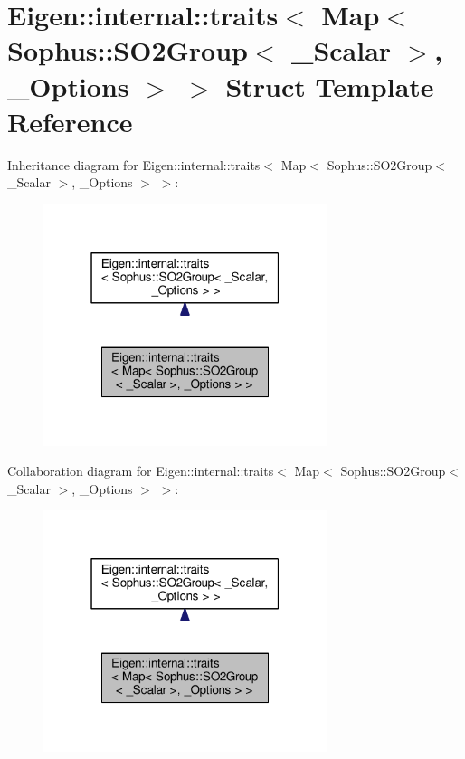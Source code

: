 \hypertarget{struct_eigen_1_1internal_1_1traits_3_01_map_3_01_sophus_1_1_s_o2_group_3_01___scalar_01_4_00_01___options_01_4_01_4}{}\section{Eigen\+:\+:internal\+:\+:traits$<$ Map$<$ Sophus\+:\+:S\+O2\+Group$<$ \+\_\+\+Scalar $>$, \+\_\+\+Options $>$ $>$ Struct Template Reference}
\label{struct_eigen_1_1internal_1_1traits_3_01_map_3_01_sophus_1_1_s_o2_group_3_01___scalar_01_4_00_01___options_01_4_01_4}


Inheritance diagram for Eigen\+:\+:internal\+:\+:traits$<$ Map$<$ Sophus\+:\+:S\+O2\+Group$<$ \+\_\+\+Scalar $>$, \+\_\+\+Options $>$ $>$\+:
\nopagebreak
\begin{figure}[H]
\begin{center}
\leavevmode
\includegraphics[width=235pt]{struct_eigen_1_1internal_1_1traits_3_01_map_3_01_sophus_1_1_s_o2_group_3_01___scalar_01_4_00_01_bf56f312ddf275fb7036c655b98f5183}
\end{center}
\end{figure}


Collaboration diagram for Eigen\+:\+:internal\+:\+:traits$<$ Map$<$ Sophus\+:\+:S\+O2\+Group$<$ \+\_\+\+Scalar $>$, \+\_\+\+Options $>$ $>$\+:
\nopagebreak
\begin{figure}[H]
\begin{center}
\leavevmode
\includegraphics[width=235pt]{struct_eigen_1_1internal_1_1traits_3_01_map_3_01_sophus_1_1_s_o2_group_3_01___scalar_01_4_00_01_7195f98ff6afc2a2016e754beff77e35}
\end{center}
\end{figure}
